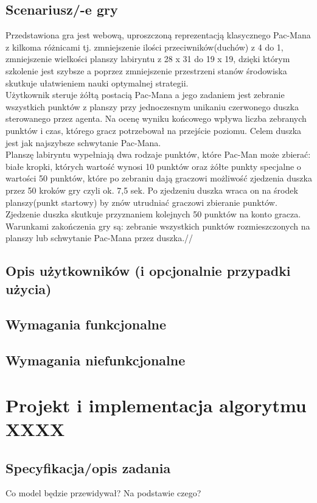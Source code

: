 \documentclass{iiuwb}
\begin{document}
\begin{itemize}
\subsection{Scenariusz/-e gry}
Przedstawiona gra jest webową, uproszczoną reprezentacją klasycznego Pac-Mana z kilkoma różnicami tj. zmniejszenie ilości przeciwników(duchów) z 4 do 1, zmniejszenie wielkości planszy labiryntu z 28 x 31 do 19 x 19,  dzięki którym szkolenie jest szybsze a poprzez zmniejszenie przestrzeni stanów środowiska skutkuje ułatwieniem nauki optymalnej strategii.\\
Użytkownik steruje żółtą postacią Pac-Mana a jego zadaniem jest zebranie wszystkich punktów z planszy przy jednoczesnym unikaniu czerwonego duszka sterowanego przez agenta. Na ocenę wyniku końcowego wpływa liczba zebranych punktów i czas, którego gracz potrzebował na przejście poziomu. Celem duszka jest jak najszybsze schwytanie Pac-Mana.\\
Planszę labiryntu wypełniają dwa rodzaje punktów, które Pac-Man może zbierać: białe kropki, których wartość wynosi 10 punktów oraz żółte punkty specjalne o wartości 50 punktów, które po zebraniu dają graczowi możliwość zjedzenia duszka przez 50 kroków gry czyli ok. 7,5 sek. Po zjedzeniu duszka wraca on na środek planszy(punkt startowy) by znów utrudniać graczowi zbieranie punktów. Zjedzenie duszka skutkuje przyznaniem kolejnych 50 punktów na konto gracza.
Warunkami zakończenia gry są: zebranie wszystkich punktów rozmieszczonych na planszy lub schwytanie Pac-Mana przez duszka.//

\subsection{Opis użytkowników (i opcjonalnie przypadki użycia)}
\subsection{Wymagania funkcjonalne}
\subsection{Wymagania niefunkcjonalne}

\section{Projekt i implementacja algorytmu XXXX}
\subsection{Specyfikacja/opis zadania }
Co model będzie przewidywał? Na podstawie czego?

\end{itemize}
\end{document}

